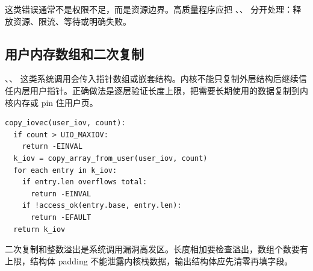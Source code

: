 这类错误通常不是权限不足，而是资源边界。高质量程序应把 、、 分开处理：释放资源、限流、等待或明确失败。

\subsection{用户内存数组和二次复制}

、、 这类系统调用会传入指针数组或嵌套结构。内核不能只复制外层结构后继续信任内层用户指针。正确做法是逐层验证长度上限，把需要长期使用的数据复制到内核内存或 pin 住用户页。

\begin{lstlisting}
copy_iovec(user_iov, count):
  if count > UIO_MAXIOV:
    return -EINVAL
  k_iov = copy_array_from_user(user_iov, count)
  for each entry in k_iov:
    if entry.len overflows total:
      return -EINVAL
    if !access_ok(entry.base, entry.len):
      return -EFAULT
  return k_iov
\end{lstlisting}

二次复制和整数溢出是系统调用漏洞高发区。长度相加要检查溢出，数组个数要有上限，结构体 padding 不能泄露内核栈数据，输出结构体应先清零再填字段。

